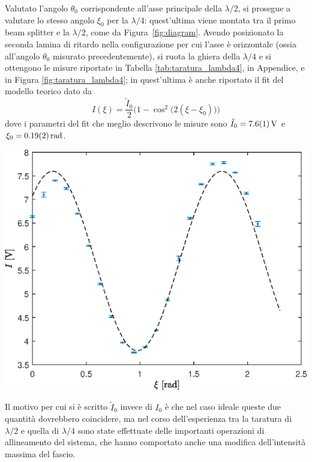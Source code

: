 \documentclass[10pt,oneside,a4paper]{article}
\newenvironment{Figure}
  {\par\medskip\noindent\minipage{\linewidth}}
  {\endminipage\par\medskip}
\begin{document}
\begin{multicols}{2}
Valutato l'angolo $\theta_0$ corrispondente all'asse principale della $\lambda/2$, si prosegue a valutare lo stesso angolo $\xi_0$ per la $\lambda/4$: quest'ultima viene montata tra il primo beam splitter e la $\lambda/2$, come da Figura~\ref{fig:diagram}. Avendo posizionato la seconda lamina di ritardo nella configurazione per cui l'asse è orizzontale (ossia all'angolo $\theta_0$ misurato precedentemente), si ruota la ghiera della $\lambda/4$ e si ottengono le misure riportate in Tabella \ref{tab:taratura_lambda4}, in Appendice, e in Figura \ref{fig:taratura_lambda4}; in quest'ultima è anche riportato il fit del modello teorico dato da
\begin{equation}
	I(\xi) = \frac{\tilde{I}_0}{2}\Big( 1- \cos^2\big(2(\xi-\xi_0)\big)\Big)
\end{equation}
dove i parametri del fit che meglio descrivono le misure sono $\tilde{I}_0 = \SI{7.6\pm0.1}{V}$ e $\xi_0 = \SI{0.19\pm0.02}{rad}$.
\begin{Figure}
	\begin{center}
	\includegraphics[width=\linewidth]{taratura_lambda4.eps}
	\label{fig:taratura_lambda4}
	\end{center}
\end{Figure}
Il motivo per cui si è scritto $\tilde{I}_0$ invece di $I_0$ è che nel caso ideale queste due quantità dovrebbero coincidere, ma nel corso dell'esperienza tra la taratura di $\lambda/2$ e quella di $\lambda/4$ sono state effettuate delle importanti operazioni di allineamento del sistema, che hanno comportato anche una modifica dell'intensità massima del fascio.


\end{multicols}
\end{document}
